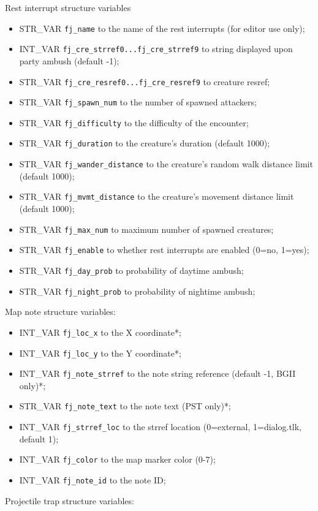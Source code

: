 \documentclass{article}
\begin{document}
Rest interrupt structure variables
\begin{itemize}
\item STR_VAR \verb+fj_name+ to the name of the rest interrupts (for editor use only);
\item INT_VAR \verb+fj_cre_strref0...fj_cre_strref9+ to string displayed upon party ambush (default -1);
\item STR_VAR \verb+fj_cre_resref0...fj_cre_resref9+ to creature resref;
\item STR_VAR \verb+fj_spawn_num+ to the number of spawned attackers;
\item STR_VAR \verb+fj_difficulty+ to the difficulty of the encounter;
\item STR_VAR \verb+fj_duration+ to the creature's duration (default 1000);
\item STR_VAR \verb+fj_wander_distance+ to the creature's random walk distance limit (default 1000);
\item STR_VAR \verb+fj_mvmt_distance+ to the creature's movement distance limit (default 1000);
\item STR_VAR \verb+fj_max_num+ to maximum number of spawned creatures;
\item STR_VAR \verb+fj_enable+ to whether rest interrupts are enabled (0=no, 1=yes);
\item STR_VAR \verb+fj_day_prob+ to probability of daytime ambush;
\item STR_VAR \verb+fj_night_prob+ to probability of nightime ambush;
\end{itemize}
Map note structure variables:
\begin{itemize}
\item INT_VAR \verb+fj_loc_x+ to the X coordinate*;
\item INT_VAR \verb+fj_loc_y+ to the Y coordinate*;
\item INT_VAR \verb+fj_note_strref+ to the note string reference (default -1, BGII only)*;
\item STR_VAR \verb+fj_note_text+ to the note text (PST only)*;
\item INT_VAR \verb+fj_strref_loc+ to the strref location (0=external, 1=dialog.tlk, default 1);
\item INT_VAR \verb+fj_color+ to the map marker color (0-7);
\item INT_VAR \verb+fj_note_id+ to the note ID;
\end{itemize}
Projectile trap structure variables:
\end{document}
